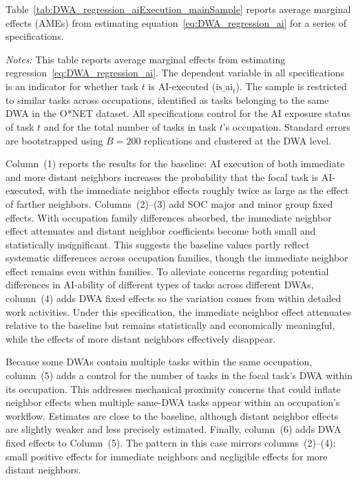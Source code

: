 Table~\ref{tab:DWA_regression_aiExecution_mainSample} reports average marginal effects (AMEs) from estimating equation~\eqref{eq:DWA_regression_ai} for a series of specifications.  
\begin{table}[t!]
\begin{center}
\caption{Effect of Neighboring Tasks' AI Execution Status on Task's AI Execution Likelihood}
\label{tab:DWA_regression_aiExecution_mainSample}
\resizebox{\textwidth}{!}{

}
\end{center}
\raggedright \footnotesize{\emph{Notes:}} 
This table reports average marginal effects from estimating regression~\eqref{eq:DWA_regression_ai}.  
The dependent variable in all specifications is an indicator for whether task $t$ is AI-executed ($\text{is\_ai}_{t}$).  
The sample is restricted to similar tasks across occupations, identified as tasks belonging to the same DWA in the O*NET dataset.  
All specifications control for the AI exposure status of task $t$ and for the total number of tasks in task $t$'s occupation.
Standard errors are bootstrapped using $B=200$ replications and clustered at the DWA level.
\end{table}
Column~(1) reports the results for the baseline: AI execution of both immediate and more distant neighbors increases the probability that the focal task is AI-executed, with the immediate neighbor effects roughly twice as large as the effect of farther neighbors.  
Columns~(2)--(3) add SOC major and minor group fixed effects.  
With occupation family differences absorbed, the immediate neighbor effect attenuates and distant neighbor coefficients become both small and statistically insignificant.  
This suggests the baseline values partly reflect systematic differences across occupation families, though the immediate neighbor effect remains even within families.  
To alleviate concerns regarding potential differences in AI-ability of different types of tasks across different DWAs, column~(4) adds DWA fixed effects so the variation comes from within detailed work activities.  
Under this specification, the immediate neighbor effect attenuates relative to the baseline but remains statistically and economically meaningful, while the effects of more distant neighbors effectively disappear.

Because some DWAs contain multiple tasks within the same occupation, column~(5) adds a control for the number of tasks in the focal task's DWA within its occupation.
This addresses mechanical proximity concerns that could inflate neighbor effects when multiple same-DWA tasks appear within an occupation's workflow.  
Estimates are close to the baseline, although distant neighbor effects are slightly weaker and less precisely estimated.  
Finally, column~(6) adds DWA fixed effects to Column~(5).  
The pattern in this case mirrors columns~(2)--(4): small positive effects for immediate neighbors and negligible effects for more distant neighbors.  

